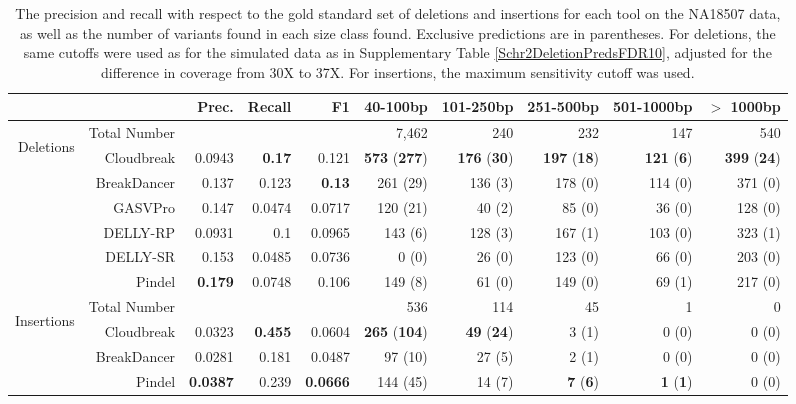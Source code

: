 \documentclass{bioinfo}
\begin{document}
\begin{table}
\begin{center}
\footnotesize
\begin{tabular}{r|rrrr|rrrrr}
  \cline{2-10}
&  & Prec. & Recall & F1 & 40-100bp & 101-250bp & 251-500bp & 501-1000bp & $>$ 1000bp \\ 
\hline
\multirow{6}{*}{\begin{sideways}Deletions\end{sideways}} & Total Number & & & & 7,462 & 240 & 232 & 147 & 540 \\
  \hline
\cline{2-10}
& Cloudbreak & 0.0943 & \textbf{0.17} & 0.121 & \textbf{573} (\textbf{277})  & \textbf{176} (\textbf{30}) &  \textbf{197} (\textbf{18}) & \textbf{121} (\textbf{6}) & \textbf{399} (\textbf{24}) \\ 
& BreakDancer & 0.137 & 0.123 &  \textbf{0.13} & 261 (29)  & 136 (3) &  178 (0) & 114 (0) & 371 (0) \\  
&  GASVPro & 0.147 & 0.0474 &  0.0717 & 120 (21)  & 40 (2) &  85 (0) & 36 (0) & 128 (0) \\ 
&  DELLY-RP & 0.0931 & 0.1 &  0.0965 & 143 (6)  & 128 (3) &  167 (1) & 103 (0) & 323 (1) \\ 
&  DELLY-SR & 0.153 & 0.0485 &  0.0736 & 0 (0)  & 26 (0) &  123 (0) & 66 (0) & 203 (0) \\ 
&  Pindel & \textbf{0.179} & 0.0748 &  0.106 & 149 (8)  & 61 (0) &  149 (0) & 69 (1) & 217 (0) \\ 
\hline
\multirow{4}{*}{\begin{sideways}Insertions\end{sideways}} & Total Number & & & & 536 & 114 & 45 & 1 & 0 \\
\cline{2-10}
& Cloudbreak & 0.0323 & \textbf{0.455} &  0.0604 & \textbf{265} (\textbf{104})  & \textbf{49} (\textbf{24}) &  3 (1) & 0 (0)  & 0 (0)  \\ 
& BreakDancer & 0.0281 & 0.181 &  0.0487 & 97 (10)  & 27 (5) &  2 (1) & 0 (0) & 0 (0) \\  
&  Pindel & \textbf{0.0387} & 0.239 &  \textbf{0.0666} & 144 (45)  & 14 (7) &  \textbf{7} (\textbf{6}) & \textbf{1} (\textbf{1}) &  0 (0) \\ 
\hline
\end{tabular}
\end{center}
\caption{The precision and recall with respect to the gold standard set of deletions and insertions for each tool on the NA18507 data, as well as the number of variants found in each size class found. Exclusive predictions are in parentheses. For deletions, the same cutoffs were used as for the simulated data as in Supplementary Table \ref{Schr2DeletionPredsFDR10}, adjusted for the difference in coverage from 30X to 37X. For insertions, the maximum sensitivity cutoff was used.}
\label{NA18507DeletionAndInsertionPreds}
\end{table}
\end{document}
